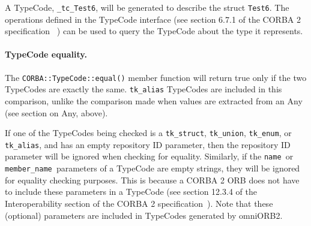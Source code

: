 \documentclass[11pt,twoside,onecolumn]{book}
\begin{document}
A TypeCode, {\tt \_tc\_Test6}, will be generated to describe the struct 
{\tt Test6}. The operations defined in the TypeCode interface (see 
section 6.7.1 of the CORBA 2 specification~\cite{corba2-spec} ) can be used to
query the TypeCode about the type it represents.


\paragraph*{TypeCode equality.}
The {\tt CORBA::TypeCode::equal()} member function will return true only if 
the two TypeCodes are exactly the same. {\tt tk\_alias} TypeCodes are included
in this comparison, unlike the comparison made when values are extracted from 
an Any (see section on Any, above). 

If one of the TypeCodes being checked is a {\tt tk\_struct}, {\tt tk\_union},
{\tt tk\_enum}, or {\tt tk\_alias}, and has an empty repository ID parameter,
then the repository ID parameter will be ignored when checking for equality. 
Similarly, if the {\tt name }or {\tt member\_name }parameters of a TypeCode are
empty strings, they will be ignored for equality checking purposes. This is 
because a CORBA 2 ORB does not have to include these parameters in a TypeCode 
(see section 12.3.4 of the Interoperability section of the CORBA 2 
specification~\cite{corba2-spec}). Note that these (optional) parameters are 
included in TypeCodes generated by omniORB2.


\newpage
\end{document}
